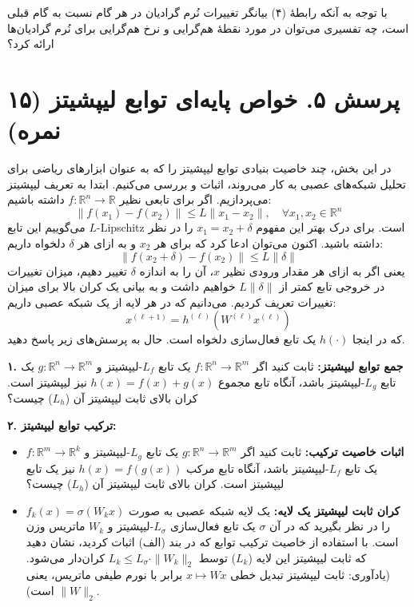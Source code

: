 با توجه به آنکه رابطهٔ (۴) بیانگر تغییرات نُرم گرادیان در هر گام نسبت به گام قبلی است، چه تفسیری می‌توان در مورد نقطهٔ هم‌گرایی و نرخ هم‌گرایی برای نُرم گرادیان‌ها ارائه کرد؟

\vspace{1cm}

\section*{پرسش ۵. خواص پایه‌ای توابع لیپشیتز (۱۵ نمره)}

در این بخش، چند خاصیت بنیادی توابع لیپشیتز را که به عنوان ابزارهای ریاضی برای تحلیل شبکه‌های عصبی به کار می‌روند، اثبات و بررسی می‌کنیم. ابتدا به تعریف لیپشیتز می‌پردازیم.
اگر برای تابعی نظیر $f : \mathbb{R}^n \to \mathbb{R}$ داشته باشیم:
\begin{equation*}
\|f(x_1) - f(x_2)\| \le L\|x_1 - x_2\|, \quad \forall x_1, x_2 \in \mathbb{R}^n
\end{equation*}
می‌گوییم این تابع $L$-Lipschitz است. برای درک بهتر این مفهوم $x_1 = x_2 + \delta$ را در نظر داشته باشید. اکنون می‌توان ادعا کرد که برای هر $x_2$ و به ازای هر $\delta$ دلخواه داریم:
\begin{equation*}
\|f(x_2+\delta) - f(x_2)\| \le L\|\delta\|
\end{equation*}
یعنی اگر به ازای هر مقدار ورودی نظیر $x$، آن را به اندازه $\delta$ تغییر دهیم، میزان تغییرات در خروجی تابع کمتر از $L\|\delta\|$ خواهیم داشت و به بیانی یک کران بالا برای میزان تغییرات تعریف کردیم.
می‌دانیم که در هر لایه از یک شبکه عصبی داریم:
\begin{equation*}
x^{(\ell+1)} = h^{(\ell)}(W^{(\ell)}x^{(\ell)})
\end{equation*}
که در اینجا $h(\cdot)$ یک تابع فعال‌سازی دلخواه است. حال به پرسش‌های زیر پاسخ دهید.

\textbf{۱. جمع توابع لیپشیتز:} ثابت کنید اگر $f : \mathbb{R}^n \to \mathbb{R}^m$ یک تابع $L_f$-لیپشیتز و $g : \mathbb{R}^n \to \mathbb{R}^m$ یک تابع $L_g$-لیپشیتز باشد، آنگاه تابع مجموع $h(x) = f(x) + g(x)$ نیز لیپشیتز است. کران بالای ثابت لیپشیتز آن ($L_h$) چیست؟

\textbf{۲. ترکیب توابع لیپشیتز:}
\begin{itemize}
    \item[\textbf{(الف)}] \textbf{اثبات خاصیت ترکیب:} ثابت کنید اگر $g : \mathbb{R}^n \to \mathbb{R}^m$ یک تابع $L_g$-لیپشیتز و $f : \mathbb{R}^m \to \mathbb{R}^k$ یک تابع $L_f$-لیپشیتز باشد، آنگاه تابع مرکب $h(x) = f(g(x))$ نیز یک تابع لیپشیتز است. کران بالای ثابت لیپشیتز آن ($L_h$) چیست؟
    
    \item[\textbf{(ب)}] \textbf{کران ثابت لیپشیتز یک لایه:} یک لایه شبکه عصبی به صورت $f_k(x) = \sigma(W_k x)$ را در نظر بگیرید که در آن $\sigma$ یک تابع فعال‌سازی $L_\sigma$-لیپشیتز و $W_k$ ماتریس وزن است. با استفاده از خاصیت ترکیب توابع که در بند (الف) اثبات کردید، نشان دهید که ثابت لیپشیتز این لایه ($L_k$) توسط $L_k \le L_\sigma \cdot \|W_k\|_2$ کران‌دار می‌شود. (یادآوری: ثابت لیپشیتز تبدیل خطی $x \mapsto Wx$ برابر با نورم طیفی ماتریس، یعنی $\|W\|_2$ است).
\end{itemize}

